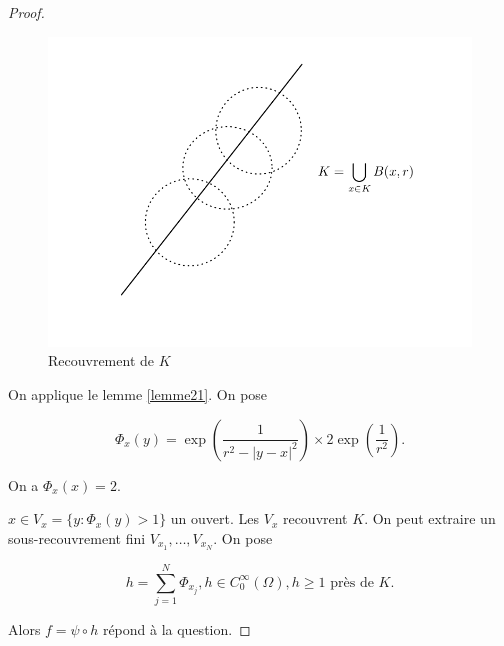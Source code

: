 \documentclass[french]{book}
\theoremstyle{definition}
\newcommand{\biggg}{>}
\newcommand{\bg}{\biggg}
\begin{document}
\begin{proof}

  \begin{figure}[h!]
    \centering
    \includegraphics[scale=0.3]{figures/part_unit_diff21.png}
    \caption{Recouvrement de \(K\)}
    \label{}
  \end{figure}

  On applique le lemme \ref{lemme21}. On pose

  \[\Phi_x(y) = \exp \left(\frac{1}{r ^2- \left\lvert y-x \right\rvert ^2}\right) \times 2 \exp \left(\frac{1}{r ^2}\right).\]

  On a \(\Phi_x(x) = 2\).

  \(x \in V_x = \{ y : \Phi_x(y) \bg 1 \}\) un ouvert. Les \(V_x\) recouvrent \(K\). On peut extraire un sous-recouvrement fini \(V _{x_1}, \dots, V _{x_N}\). On pose

  \[h = \sum_{j=1}^{N} \Phi _{x_j}, h \in C_0 ^{\infty}(\Omega), h \geq 1 \text{ près de } K.\]

  Alors \(f = \psi \circ h\) répond à la question.
\end{proof}
\end{document}
